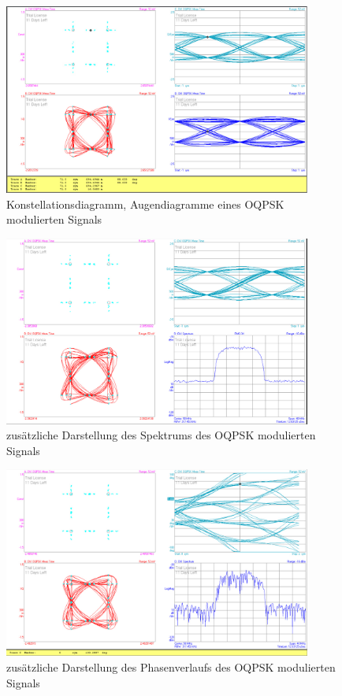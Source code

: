 \documentclass[12pt,a4paper,ngerman]{article}
\begin{document}
\begin{figure}[H]
\centering
\includegraphics[width=0.9\textwidth]{figures/Aufgabe3_OQPSK.jpg} 
\caption{Konstellationsdiagramm, Augendiagramme eines OQPSK modulierten Signals}
\label{fig:3_OQPSK}
\end{figure}

\pagebreak
\begin{figure}[H]
\centering
\includegraphics[width=0.9\textwidth]{figures/Aufgabe3_OQPSK_avg.jpg} 
\caption{zusätzliche Darstellung des Spektrums des OQPSK modulierten Signals}
\label{fig:3_OQPSK_spec}
\end{figure}

\begin{figure}[H]
\centering
\includegraphics[width=0.9\textwidth]{figures/Aufgabe3_OQPSK_phase.jpg} 
\caption{zusätzliche Darstellung des Phasenverlaufs des OQPSK modulierten Signals}
\label{fig:3_OQPSK_phase}
\end{figure}
\end{document}
